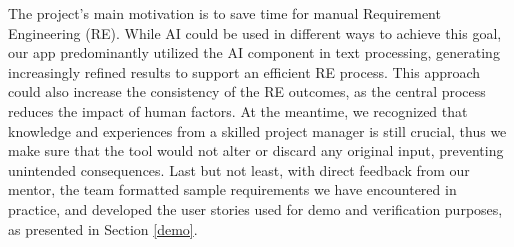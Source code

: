 The project's main motivation is to save time for manual Requirement Engineering (RE). While AI could be used in different ways to achieve this goal, our app predominantly utilized the AI component in text processing, generating increasingly refined results to support an efficient RE process. This approach could also increase the consistency of the RE outcomes, as the central process reduces the impact of human factors. At the meantime, we recognized that knowledge and experiences from a skilled project manager is still crucial, thus we make sure that the tool would not alter or discard any original input, preventing unintended consequences. Last but not least, with direct feedback from our mentor, the team formatted sample requirements we have encountered in practice, and developed the user stories used for demo and verification purposes, as presented in Section \ref{demo}.
